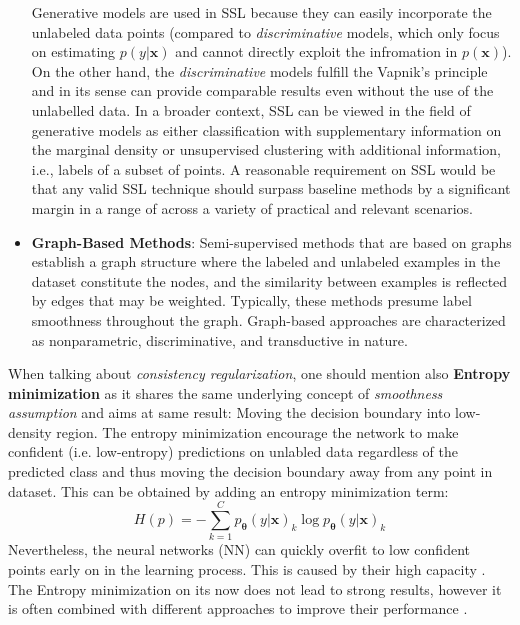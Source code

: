 \begin{itemize}
        Generative models are used in SSL because they can easily incorporate the unlabeled data points (compared to \textit{discriminative} models, which only focus on estimating
        $p(y|\mathbf{x})$ and cannot directly exploit the infromation in $p(\mathbf{x})$). On the other hand, the \textit{discriminative} models fulfill the Vapnik's principle and in its
        sense can provide comparable results even without the use of the unlabelled data.  In a broader context, SSL can be viewed in the field of generative models as 
        either classification with supplementary information on the marginal density or unsupervised clustering with additional information, i.e., labels of a subset 
        of points. A reasonable requirement on SSL would be that any valid SSL technique should surpass baseline methods by a significant margin in a range of across a
        variety of practical and relevant scenarios. 
    \item \textbf{Graph-Based Methods}:
    Semi-supervised methods that are based on graphs establish a graph structure where the labeled and unlabeled examples in the dataset constitute the nodes, and the 
    similarity between examples is reflected by edges that may be weighted. Typically, these methods presume label smoothness throughout the graph. Graph-based 
    approaches are characterized as nonparametric, discriminative, and transductive in nature\cite{another-survey-2008}.
\end{itemize}

When talking about \textit{consistency regularization}, one should mention also \textbf{Entropy minimization}\cite{entropy-min-2004} as it shares the same underlying concept
of \textit{smoothness assumption} and aims at same result: Moving the decision boundary into low-density region. The entropy minimization encourage the 
network to make confident (i.e. low-entropy) predictions on unlabled data regardless of the predicted class and thus moving the decision boundary away from any point in dataset.
This can be obtained by adding an entropy minimization term:
\begin{equation*}
    H(p) = -\sum_{k=1}^{C} p_\mathbf{\theta}(y|\mathbf{x})_k \log p_\mathbf{\theta}(y|\mathbf{x})_k
\end{equation*}
Nevertheless, the neural networks (NN) can quickly overfit to low confident points early on in the learning process. This is caused by their high capacity \cite{how-to-evalute-ssl-2018}.
The Entropy minimization on its now does not lead to strong results, however it is often combined with different approaches to improve their performance \cite{ssl-overview-2020}.

